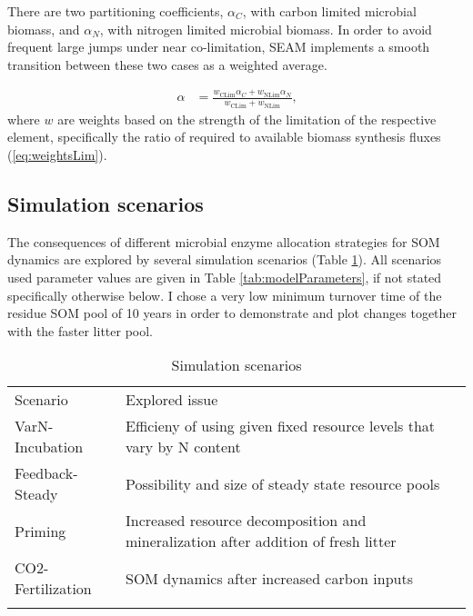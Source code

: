 There are two partitioning coefficients, $\alpha_C$, with carbon limited
microbial biomass, and $\alpha_N$, with nitrogen limited microbial biomass. In order to
avoid frequent large jumps under near co-limitation, SEAM implements a smooth
transition between these two cases as a weighted average.

\begin{subequations}
\label{eq:allocRev}
\begin{align}
\alpha &= \frac{w_{\operatorname{CLim}} \alpha_C + w_{\operatorname{NLim}}
\alpha_N}{w_{\operatorname{CLim}}  + w_{\operatorname{NLim}} } 
\text{,} 
\end{align}
\end{subequations}
where $w$ are weights based on the strength of the limitation of the respective
element, specifically the ratio of required to available biomass synthesis fluxes (\ref{eq:weightsLim}). 


\subsection{ Simulation scenarios 
\label{sec:SimScen}}

The consequences of different microbial enzyme allocation strategies for SOM
dynamics are explored by several simulation scenarios (Table \ref{tab:SimScen}). 
All scenarios used parameter values are given in Table \ref{tab:modelParameters}, if not
stated specifically otherwise below. I chose a very low minimum turnover time
of the residue SOM pool of 10 years in order to demonstrate and plot changes together
with the faster litter pool.

\begin{table}[t]
\caption{Simulation scenarios \label{tab:SimScen}}
\vskip4mm
\centering
\begin{tabular}{lp{5.3cm}}
\tophline
Scenario & Explored issue\\
\middlehline
VarN-Incubation & Efficieny of using given fixed resource levels that
vary by N content \\
Feedback-Steady & Possibility and size of steady state resource pools\\
Priming & Increased resource decomposition and mineralization after
addition of fresh litter\\
CO2-Fertilization & SOM dynamics after increased carbon inputs\\
\bottomhline
\end{tabular}
\end{table}

